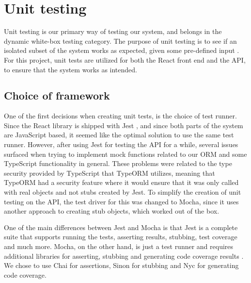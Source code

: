 \section{Unit testing}
Unit testing is our primary way of testing our system, and belongs in the dynamic white-box testing category.
The purpose of unit testing is to see if an isolated subset of the system works as expected, given some pre-defined input \cite{TestDrivenDevelopment}.
For this project, unit tests are utilized for both the React front end and the API, to ensure that the system works as intended.

\subsection{Choice of framework}
One of the first decisions when creating unit tests, is the choice of test runner.
Since the React library is shipped with Jest \cite{ReactRunningTests}, and since both parts of the system are JavaScript based, it seemed like the optimal solution to use the same test runner.
However, after using Jest for testing the API for a while, several issues surfaced when trying to implement mock functions related to our ORM and some TypeScript functionality in general.
These problems were related to the type security provided by TypeScript that TypeORM utilizes, meaning that TypeORM had a security feature where it would ensure that it was only called with real objects and not stubs created by Jest.
To simplify the creation of unit testing on the API, the test driver for this was changed to Mocha, since it uses another approach to creating stub objects, which worked out of the box.

One of the main differences between Jest and Mocha is that Jest is a complete suite that supports running the tests, asserting results, stubbing, test coverage and much more.
Mocha, on the other hand, is just a test runner and requires additional libraries for asserting, stubbing and generating code coverage results \cite{Mocha}.
We chose to use Chai for assertions, Sinon for stubbing and Nyc for generating code coverage.


